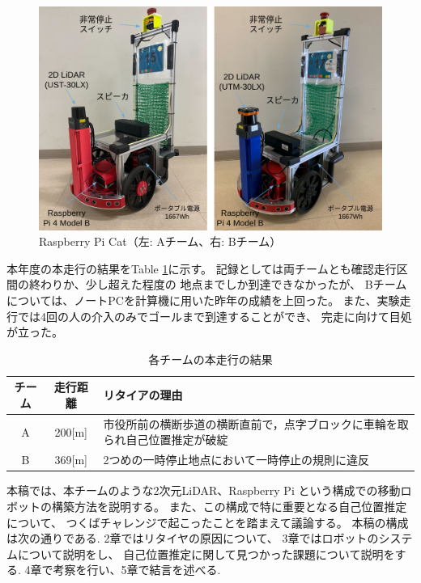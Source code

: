 \documentclass[twocolumn,9pt]{jsproceedings}
\begin{document}
\begin{figure}[h]
 	\begin{center}
 		\includegraphics[width=1.0\linewidth]{figs/raspicat.pdf}
 		\caption{Raspberry Pi Cat（左: Aチーム、右: Bチーム）}
 		\label{fig:raspicat}
 	\end{center}
\end{figure}

本年度の本走行の結果をTable \ref{MainRun}に示す。
記録としては両チームとも確認走行区間の終わりか、少し超えた程度の
地点までしか到達できなかったが、
Bチームについては、ノートPCを計算機に用いた昨年の成績を上回った。
また、実験走行では4回の人の介入のみでゴールまで到達することができ、
完走に向けて目処が立った。

\begin{table}[h]
  \caption{各チームの本走行の結果}
  \label{MainRun}
	\begin{tabular}{|c|c|p{5.4cm}|}
    \hline
	チーム & 走行距離 & リタイアの理由 \\
    \hline
	A & 200[m] & 市役所前の横断歩道の横断直前で，点字ブロックに車輪を取られ自己位置推定が破綻\\
    \hline
	B & 369[m] & 2つめの一時停止地点において一時停止の規則に違反 \\ 
    \hline
  \end{tabular}
\end{table}


本稿では、本チームのような2次元LiDAR、Raspberry Pi
という構成での移動ロボットの構築方法を説明する。
また、この構成で特に重要となる自己位置推定について、
つくばチャレンジで起こったことを踏まえて議論する。
本稿の構成は次の通りである. 
2章ではリタイヤの原因について、
3章ではロボットのシステムについて説明をし、
自己位置推定に関して見つかった課題について説明をする. 
4章で考察を行い、5章で結言を述べる. 
\end{document}
